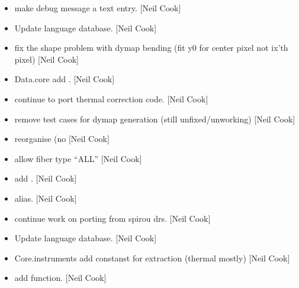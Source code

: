 \documentclass[a4paper,10pt,english]{report}
\begin{document}
\begin{itemize}
\item {} 
 \sphinxhyphen{} make debug message a text entry. {[}Neil Cook{]}

\item {} 
Update language database. {[}Neil Cook{]}

\item {} 
 \sphinxhyphen{} fix the shape problem with dymap bending (fit y0 for
center pixel not ix’th pixel) {[}Neil Cook{]}

\item {} 
Data.core \sphinxhyphen{} add . {[}Neil Cook{]}

\item {} 
 \sphinxhyphen{} continue to port thermal correction code. {[}Neil
Cook{]}

\item {} 
 \sphinxhyphen{} remove test cases for dymap generation (still
unfixed/unworking) {[}Neil Cook{]}

\item {} 
 \sphinxhyphen{} reorganise  (no  {[}Neil
Cook{]}

\item {} 
 \sphinxhyphen{} allow fiber type “ALL” {[}Neil Cook{]}

\item {} 
 \sphinxhyphen{} add . {[}Neil Cook{]}

\item {} 
 \sphinxhyphen{}  alias. {[}Neil Cook{]}

\item {} 
 \sphinxhyphen{} continue work on porting from spirou drs.
{[}Neil Cook{]}

\item {} 
Update language database. {[}Neil Cook{]}

\item {} 
Core.instruments \sphinxhyphen{} add constanst for extraction (thermal mostly) {[}Neil
Cook{]}

\item {} 
 \sphinxhyphen{} add  function. {[}Neil Cook{]}


\end{itemize}
\end{document}
